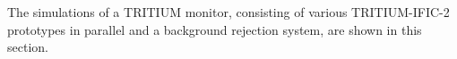 The simulations of a TRITIUM monitor, consisting of various TRITIUM-IFIC-2 prototypes in parallel and a background rejection system, are shown in this section.